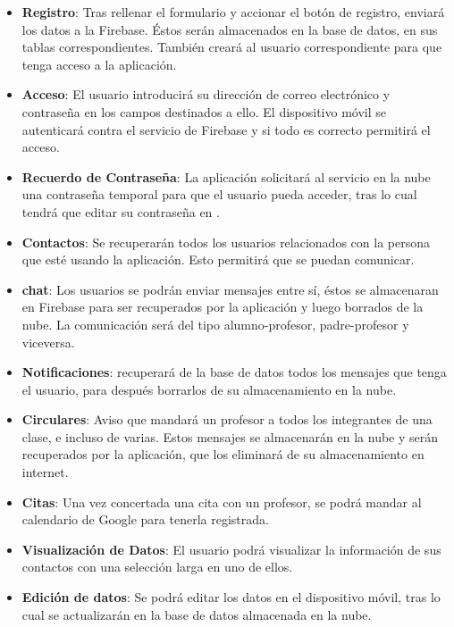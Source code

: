 		\begin{itemize} 
			\item {\bf Registro}: Tras rellenar el formulario y accionar el botón de registro, \CollegeApp enviará los datos a la Firebase. Éstos serán almacenados en la base de datos, en sus tablas correspondientes. También creará al usuario correspondiente para que tenga acceso a la aplicación.
			\item {\bf Acceso}: El usuario introducirá su dirección de correo electrónico y contraseña en los campos destinados a ello. El dispositivo móvil se autenticará contra el servicio de Firebase y si todo es correcto permitirá el acceso.
			\item {\bf Recuerdo de Contraseña}: La aplicación solicitará al servicio en la nube una contraseña temporal para que el usuario pueda acceder, tras lo cual tendrá que editar su contraseña en \CollegeApp.
			\item {\bf Contactos}: Se recuperarán todos los usuarios relacionados con la persona que esté usando la aplicación. Esto permitirá que se puedan comunicar.
			\item {\bf chat}: Los usuarios se podrán enviar mensajes entre sí, éstos se almacenaran en Firebase para ser recuperados por la aplicación y luego borrados de la nube. La comunicación será del tipo alumno-profesor, padre-profesor y viceversa.
			\item {\bf Notificaciones}: \CollegeApp recuperará de la base de datos todos los mensajes que tenga el usuario, para después borrarlos de su almacenamiento en la nube.
			\item {\bf Circulares}: Aviso que mandará un profesor a todos los integrantes de una clase, e incluso de varias. Estos mensajes se almacenarán en la nube y serán recuperados por la aplicación, que los eliminará de su almacenamiento en internet.
			\item {\bf Citas}: Una vez concertada una cita con un profesor, se podrá mandar al calendario de Google para tenerla registrada.
			\item {\bf Visualización de Datos}: El usuario podrá visualizar la información de sus contactos con una selección larga en uno de ellos.
			\item {\bf Edición de datos}: Se podrá editar los datos en el dispositivo móvil, tras lo cual se actualizarán en la base de datos almacenada en la nube. 
		\end{itemize}

